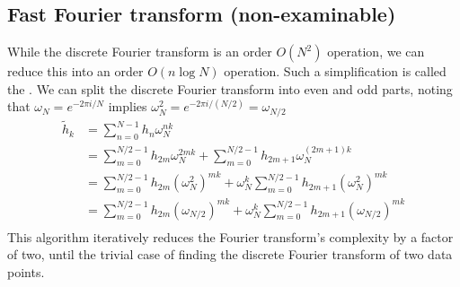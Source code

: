 \subsection{Fast Fourier transform (non-examinable)}
While the discrete Fourier transform is an order $O(N^2)$ operation, we can reduce this into an order $O(n \log N)$ operation.
Such a simplification is called the .
We can split the discrete Fourier transform into even and odd parts, noting that $\omega_N = e^{-2\pi i / N}$ implies $\omega_N^2 = e^{-2 \pi i / (N/2)} = \omega_{N/2}$
\begin{align*}
	\widetilde h_k & = \sum_{n=0}^{N-1} h_n \omega_N^{nk}                                                                           \\
    & = \sum_{m=0}^{N/2-1} h_{2m} \omega_N^{2mk} + \sum_{m=0}^{N/2-1} h_{2m + 1} \omega_N^{(2m+1)k}                  \\
    & = \sum_{m=0}^{N/2-1} h_{2m} (\omega_N^2)^{mk} + \omega_N^k \sum_{m=0}^{N/2-1} h_{2m + 1} (\omega_N^2)^{mk}     \\
    & = \sum_{m=0}^{N/2-1} h_{2m} (\omega_{N/2})^{mk} + \omega_N^k \sum_{m=0}^{N/2-1} h_{2m + 1} (\omega_{N/2})^{mk} \\
\end{align*}
This algorithm iteratively reduces the Fourier transform's complexity by a factor of two, until the trivial case of finding the discrete Fourier transform of two data points.